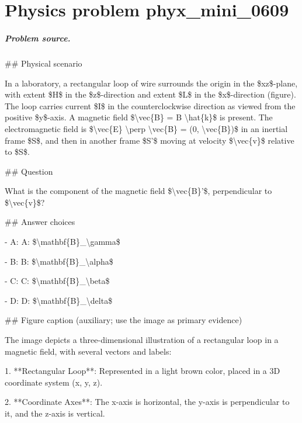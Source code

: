 
\chapter{Physics problem phyx\_mini\_0609}
\label{ch:PhyXMiniProblems_problem_phyx_mini_0609}

\paragraph{Problem source.}
\#\# Physical scenario

In a laboratory, a rectangular loop of wire surrounds the origin in the \$xz\$-plane, with extent \$H\$ in the \$z\$-direction and extent \$L\$ in the \$x\$-direction (figure). The loop carries current \$I\$ in the counterclockwise direction as viewed from the positive \$y\$-axis. A magnetic field \$\textbackslash{}vec\{B\} = B \textbackslash{}hat\{k\}\$ is present. The electromagnetic field is \$\textbackslash{}vec\{E\} \textbackslash{}perp \textbackslash{}vec\{B\} = (0, \textbackslash{}vec\{B\})\$ in an inertial frame \$S\$, and then in another frame \$S'\$ moving at velocity \$\textbackslash{}vec\{v\}\$ relative to \$S\$.

\#\# Question

What is the component of the magnetic field \$\textbackslash{}vec\{B\}'\$, perpendicular to \$\textbackslash{}vec\{v\}\$?

\#\# Answer choices

- A: A: \$\textbackslash{}mathbf\{B\}\_\textbackslash{}gamma\$

- B: B: \$\textbackslash{}mathbf\{B\}\_\textbackslash{}alpha\$

- C: C: \$\textbackslash{}mathbf\{B\}\_\textbackslash{}beta\$

- D: D: \$\textbackslash{}mathbf\{B\}\_\textbackslash{}delta\$

\#\# Figure caption (auxiliary; use the image as primary evidence)

The image depicts a three-dimensional illustration of a rectangular loop in a magnetic field, with several vectors and labels:

1. **Rectangular Loop**: Represented in a light brown color, placed in a 3D coordinate system (x, y, z).

2. **Coordinate Axes**: The x-axis is horizontal, the y-axis is perpendicular to it, and the z-axis is vertical.

